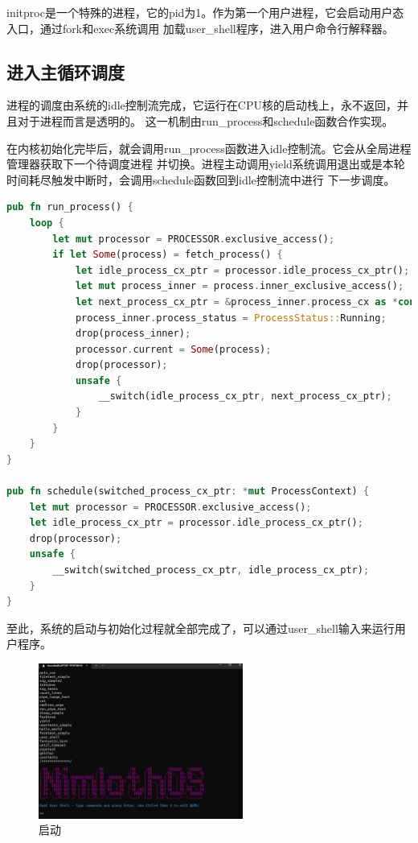 initproc是一个特殊的进程，它的pid为1。作为第一个用户进程，它会启动用户态入口，通过fork和exec系统调用
加载user\_shell程序，进入用户命令行解释器。

\subsection{进入主循环调度}

进程的调度由系统的idle控制流完成，它运行在CPU核的启动栈上，永不返回，并且对于进程而言是透明的。
这一机制由run\_process和schedule函数合作实现。

在内核初始化完毕后，就会调用run\_process函数进入idle控制流。它会从全局进程管理器获取下一个待调度进程
并切换。进程主动调用yield系统调用退出或是本轮时间耗尽触发中断时，会调用schedule函数回到idle控制流中进行
下一步调度。

\begin{lstlisting}[language=Rust,caption={idle控制流}, label={lst:idle-control-flow}]
pub fn run_process() {
    loop {
        let mut processor = PROCESSOR.exclusive_access();
        if let Some(process) = fetch_process() {
            let idle_process_cx_ptr = processor.idle_process_cx_ptr();
            let mut process_inner = process.inner_exclusive_access();
            let next_process_cx_ptr = &process_inner.process_cx as *const ProcessContext;
            process_inner.process_status = ProcessStatus::Running;
            drop(process_inner);
            processor.current = Some(process);
            drop(processor);
            unsafe {
                __switch(idle_process_cx_ptr, next_process_cx_ptr);
            }
        }
    }
}

pub fn schedule(switched_process_cx_ptr: *mut ProcessContext) {
    let mut processor = PROCESSOR.exclusive_access();
    let idle_process_cx_ptr = processor.idle_process_cx_ptr();
    drop(processor);
    unsafe {
        __switch(switched_process_cx_ptr, idle_process_cx_ptr);
    }
}
\end{lstlisting}

至此，系统的启动与初始化过程就全部完成了，可以通过user\_shell输入来运行用户程序。

\begin{figure}[htbp]
    \centering
    \includegraphics[width=0.6\textwidth]{../image/启动.png}
    \caption{启动}
    \label{fig:启动}
\end{figure}